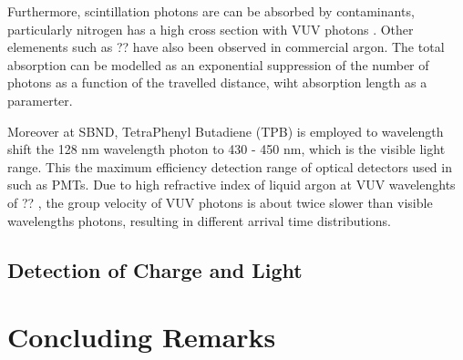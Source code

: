 Furthermore, scintillation photons are can be absorbed by contaminants, particularly nitrogen has a high cross section with VUV photons \cite{}.
Other elemenents such as ?? have also been observed in commercial argon.
The total absorption can be modelled as an exponential suppression of the number of photons as a function of the travelled distance, wiht absorption length as a paramerter. 

Moreover at SBND, TetraPhenyl Butadiene (TPB) is employed to wavelength shift the 128 nm wavelength photon to 430 - 450 nm, which is the visible light range.
This the maximum efficiency detection range of optical detectors used in such as PMTs.
Due to high refractive index of liquid argon at VUV wavelenghts of ?? \cite{}, the group velocity of VUV photons is about twice slower than visible wavelengths photons, resulting in different arrival time distributions.




\subsection{Detection of Charge and Light}

\label{sec3:detection}




\section{Concluding Remarks}
